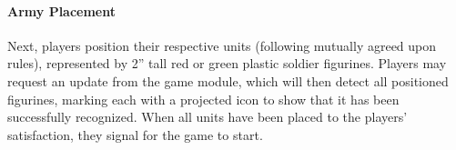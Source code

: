 \documentclass[10pt,twocolumn,letterpaper]{article}
\begin{document}

\vspace{-0.15in}
\paragraph{Army Placement}

Next, players 
position
their respective units (following mutually agreed upon rules), 
represented by 2'' tall red or green plastic
soldier figurines.
Players may request an update from the game module, which will then
detect all positioned figurines, marking each 
with a 
projected icon to show that it has been successfully recognized.
When all units have been placed to the players' satisfaction, they
signal for the game to start.
\end{document}
